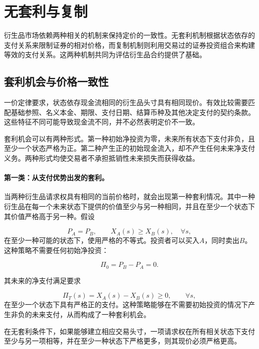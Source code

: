 \section{无套利与复制}

衍生品市场依赖两种相关的机制来保持定价的一致性。无套利机制根据状态依存的支付关系来限制证券的相对价格，而复制机制则利用交易过的证券投资组合来构建等效的支付关系。这两种机制共同为评估衍生品合约提供了基础。

\subsection{套利机会与价格一致性}

一价定律要求，状态依存现金流相同的衍生品头寸具有相同现价。有效比较需要匹配基础参照、名义本金、期限、支付日期、结算币种及其他决定支付的契约条款。这些特征不同可能导致现金流不同，并不必然表明定价不一致。

套利机会可以有两种形式。第一种初始净投资为零，未来所有状态下支付非负，且至少一个状态严格为正。第二种产生正的初始现金流入，却不产生任何未来净支付义务。两种形式均使交易者不承担抵销性未来损失而获得收益。

\paragraph{第一类：从支付优势出发的套利。}

当两种衍生品请求权具有相同的当前价格时，就会出现第一种套利情况。其中一种衍生品在每一个未来状态下提供的价值至少与另一种相同，并且在至少一个状态下其价值严格高于另一种。假设

\begin{equation}
P_A=P_B,
\qquad
X_A(s)\geq X_B(s), \quad \forall s,
\label{eq:ch11-payoff-dominance}
\end{equation}
在至少一种可能的状态下，使用严格的不等式。投资者可以买入$A$，同时卖出$B$。这种策略不需要任何初始净投资：

\begin{equation}
\Pi_0=P_B-P_A=0.
\end{equation}

其未来的净支付满足要求

\begin{equation}
\Pi_T(s)=X_A(s)-X_B(s)\geq 0,
\qquad \forall s,
\end{equation}
在至少一个状态下具有严格正的支付。这种策略能够在不需要初始投资的情况下产生非负的未来支付，从而构成了一种套利机会。

在无套利条件下，如果能够建立相应交易头寸，一项请求权在所有相关状态下支付至少与另一项相等，并在至少一种状态下严格更多，则其现价必须严格更高。

